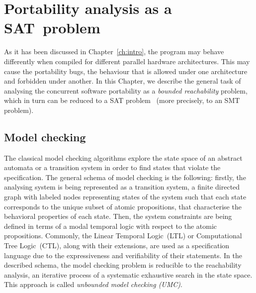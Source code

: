 \chapter{Portability analysis as a SAT~problem}
\label{ch:port}

As it has been discussed in Chapter~\ref{ch:intro}, the program may behave differently when compiled for different parallel hardware architectures. This may cause the portability bugs, the behaviour that is allowed under one architecture and forbidden under another. 
In this Chapter, we describe the general task of analysing the concurrent software portability
as a \textit{bounded reachability} problem, which in turn can be reduced to a SAT problem~\cite{Porthos17} (more precisely, to an SMT problem).


\section{Model checking}
\label{ch:port:mc}

The classical model checking algorithms explore the state space of an abstract automata or a transition system in order to find states that violate the specification. The general schema of model checking is the following: firstly, the analysing system is being represented as a transition system, a finite directed graph with labeled nodes representing states of the system such that each state corresponds to the unique subset of atomic propositions, that characterise the behavioral properties of each state. 
Then, the system constraints are being defined in terms of a modal temporal logic with respect to the atomic propositions. Commonly, the Linear Temporal Logic~(LTL) or Computational Tree Logic~(CTL), along with their extensions, are used as a specification language due to the expressiveness and verifiability of their statements. 
In the described schema, the model checking problem is reducible to the reachability analysis, an iterative process of a systematic exhaustive search in the state space. This approach is called \textit{unbounded model checking (UMC)}.

